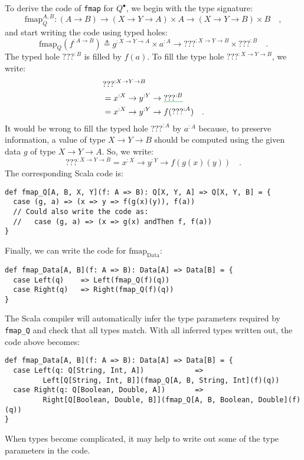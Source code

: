 To derive the code of \lstinline!fmap! for $Q^{\bullet}$, we begin
with the type signature:
\[
\text{fmap}_{Q}^{A,B}:\left(A\rightarrow B\right)\rightarrow\left(X\rightarrow Y\rightarrow A\right)\times A\rightarrow\left(X\rightarrow Y\rightarrow B\right)\times B\quad,
\]
and start writing the code using typed holes:
\[
\text{fmap}_{Q}(f^{:A\rightarrow B})\triangleq g^{:X\rightarrow Y\rightarrow A}\times a^{:A}\rightarrow\text{???}^{:X\rightarrow Y\rightarrow B}\times\text{???}^{:B}\quad.
\]
The typed hole $\text{???}^{:B}$ is filled by $f(a)$. To fill the
type hole $\text{???}^{:X\rightarrow Y\rightarrow B}$, we write:
\begin{align*}
 & \text{???}^{:X\rightarrow Y\rightarrow B}\\
 & =x^{:X}\rightarrow y^{:Y}\rightarrow\gunderline{\text{???}^{:B}}\\
 & =x^{:X}\rightarrow y^{:Y}\rightarrow f(\text{???}^{:A})\quad.
\end{align*}
It would be wrong to fill the typed hole $\text{???}^{:A}$ by $a^{:A}$
because, to preserve information, a value of type $X\rightarrow Y\rightarrow B$
should be computed using the given data $g$ of type $X\rightarrow Y\rightarrow A$.
So, we write:
\[
\text{???}^{:X\rightarrow Y\rightarrow B}=x^{:X}\rightarrow y^{:Y}\rightarrow f(g(x)(y))\quad.
\]
The corresponding Scala code is:
\begin{lstlisting}
def fmap_Q[A, B, X, Y](f: A => B): Q[X, Y, A] => Q[X, Y, B] = {
  case (g, a) => (x => y => f(g(x)(y)), f(a))
  // Could also write the code as:
  //   case (g, a) => (x => g(x) andThen f, f(a))
}
\end{lstlisting}
Finally, we can write the code for $\text{fmap}_{\text{Data}}$:
\begin{lstlisting}
def fmap_Data[A, B](f: A => B): Data[A] => Data[B] = {
  case Left(q)    => Left(fmap_Q(f)(q))
  case Right(q)   => Right(fmap_Q(f)(q))
}
\end{lstlisting}
The Scala compiler will automatically infer the type parameters required
by \lstinline!fmap_Q! and check that all types match. With all inferred
types written out, the code above becomes:
\begin{lstlisting}
def fmap_Data[A, B](f: A => B): Data[A] => Data[B] = {
  case Left(q: Q[String, Int, A])            =>
         Left[Q[String, Int, B]](fmap_Q[A, B, String, Int](f)(q))
  case Right(q: Q[Boolean, Double, A])       =>
         Right[Q[Boolean, Double, B]](fmap_Q[A, B, Boolean, Double](f)(q))
}
\end{lstlisting}
When types become complicated, it may help to write out some of the
type parameters in the code.

